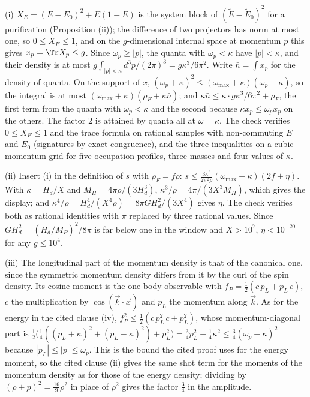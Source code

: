 (i) $X_{E} = (E - E_{0})^{2} + E(1 - E)$ is the system block of $(\widetilde E - \widetilde E_{0})^{2}$ for a purification (Proposition (ii)); the difference of two projectors has norm at most one, so $0 \le X_{E} \le 1$, and on the $g$-dimensional internal space at momentum $p$ this gives $x_{p} = \Tr X_{p} \le g$. Since $\omega_{p} \ge |p|$, the quanta with $\omega_{p} < \kappa$ have $|p| < \kappa$, and their density is at most $g\int_{|p| < \kappa}d^{3}p/(2\pi)^{3} = g\kappa^{3}/6\pi^{2}$. Write $\bar n = \int x_{p}$ for the density of quanta. On the support of $x$, $(\omega_{p} + \kappa)^{2} \le (\omega_{\max} + \kappa)(\omega_{p} + \kappa)$, so the integral is at most $(\omega_{\max} + \kappa)(\rho_{F} + \kappa\bar n)$; and $\kappa\bar n \le \kappa\cdot g\kappa^{3}/6\pi^{2} + \rho_{F}$, the first term from the quanta with $\omega_{p} < \kappa$ and the second because $\kappa x_{p} \le \omega_{p}x_{p}$ on the others. The factor $2$ is attained by quanta all at $\omega = \kappa$. The check verifies $0 \le X_{E} \le 1$ and the trace formula on rational samples with non-commuting $E$ and $E_{0}$ (signatures by exact congruence), and the three inequalities on a cubic momentum grid for five occupation profiles, three masses and four values of $\kappa$.

(ii) Insert (i) in the definition of $s$ with $\rho_{F} = f\rho$: $s \le \tfrac{3\kappa^{3}}{2\pi^{2}\rho}(\omega_{\max} + \kappa)(2f + \eta)$. With $\kappa = H_{d}/X$ and $M_{H} = 4\pi\rho/(3H_{d}^{3})$, $\kappa^{3}/\rho = 4\pi/(3X^{3}M_{H})$, which gives the display; and $\kappa^{4}/\rho = H_{d}^{4}/(X^{4}\rho) = 8\pi GH_{d}^{2}/(3X^{4})$ gives $\eta$. The check verifies both as rational identities with $\pi$ replaced by three rational values. Since $GH_{d}^{2} = (H_{d}/\bar M_{P})^{2}/8\pi$ is far below one in the window and $X > 10^{7}$, $\eta < 10^{-20}$ for any $g \le 10^{4}$.

(iii) The longitudinal part of the momentum density is that of the canonical one, since the symmetric momentum density differs from it by the curl of the spin density. Its cosine moment is the one-body observable with $f_{P} = \tfrac12(c\,p_{L} + p_{L}\,c)$, $c$ the multiplication by $\cos(\vec k\cdot\vec x)$ and $p_{L}$ the momentum along $\vec k$. As for the energy in the cited clause (iv), $f_{P}^{2} \le \tfrac12(c\,p_{L}^{2}\,c + p_{L}^{2})$, whose momentum-diagonal part is $\tfrac12\bigl(\tfrac14((p_{L} + \kappa)^{2} + (p_{L} - \kappa)^{2}) + p_{L}^{2}\bigr) = \tfrac34p_{L}^{2} + \tfrac14\kappa^{2} \le \tfrac34(\omega_{p} + \kappa)^{2}$ because $|p_{L}| \le |p| \le \omega_{p}$. This is the bound the cited proof uses for the energy moment, so the cited clause (ii) gives the same shot term for the moments of the momentum density as for those of the energy density; dividing by $(\rho + p)^{2} = \tfrac{16}{9}\rho^{2}$ in place of $\rho^{2}$ gives the factor $\tfrac34$ in the amplitude.

